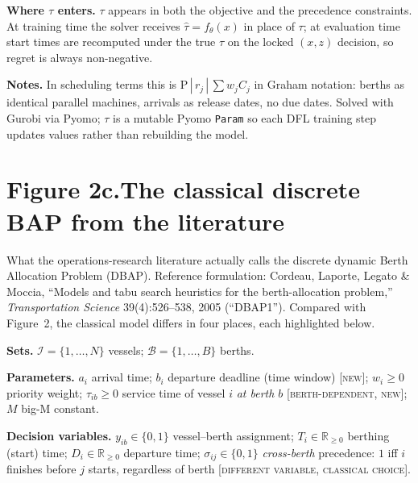 \documentclass[11pt]{article}
\begin{document}
\vspace{0.6em}

\noindent\textbf{Where $\tau$ enters.}
$\tau$ appears in both the objective and the precedence constraints.
At training time the solver receives $\hat{\tau}=f_\theta(x)$ in place
of $\tau$; at evaluation time start times are recomputed under the
true $\tau$ on the locked $(x,z)$ decision, so regret is always
non-negative.

\vspace{0.3em}

\noindent\textbf{Notes.}
In scheduling terms this is $\mathrm{P}\,|\,r_j\,|\,\sum w_j C_j$ in
Graham notation: berths as identical parallel machines, arrivals as
release dates, no due dates. Solved with Gurobi via Pyomo; $\tau$ is
a mutable Pyomo \texttt{Param} so each DFL training step updates
values rather than rebuilding the model.

\newpage

\section*{Figure 2c.\quad The classical discrete BAP from the literature}

\noindent
What the operations-research literature actually calls the discrete
dynamic Berth Allocation Problem (DBAP). Reference formulation:
Cordeau, Laporte, Legato \& Moccia, ``Models and tabu search heuristics
for the berth-allocation problem,'' \emph{Transportation Science}
39(4):526--538, 2005 (``DBAP1''). Compared with Figure~2, the
classical model differs in four places, each highlighted below.

\vspace{0.5em}

\noindent\textbf{Sets.}
$\mathcal{I}=\{1,\dots,N\}$ vessels;\;
$\mathcal{B}=\{1,\dots,B\}$ berths.

\smallskip
\noindent\textbf{Parameters.}
$a_i$ arrival time;\;
$b_i$ departure deadline (time window) \textsc{[new]};\;
$w_i\geq 0$ priority weight;\;
$\tau_{ib}\geq 0$ service time of vessel $i$ \emph{at berth $b$}
\textsc{[berth-dependent, new]};\;
$M$ big-M constant.

\smallskip
\noindent\textbf{Decision variables.}
$y_{ib}\in\{0,1\}$ vessel--berth assignment;\;
$T_i\in\mathbb{R}_{\geq 0}$ berthing (start) time;\;
$D_i\in\mathbb{R}_{\geq 0}$ departure time;\;
$\sigma_{ij}\in\{0,1\}$ \emph{cross-berth} precedence: $1$ iff $i$
finishes before $j$ starts, regardless of berth
\textsc{[different variable, classical choice]}.
\end{document}
